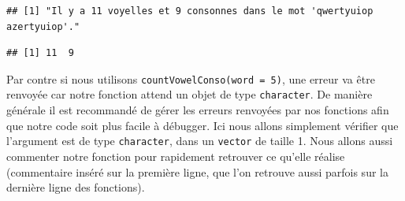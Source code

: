 \documentclass[
]{book}
\newenvironment{Shaded}{\begin{snugshade}}{\end{snugshade}}
\newcommand{\ControlFlowTok}[1]{\textcolor[rgb]{0.13,0.29,0.53}{\textbf{#1}}}
\newcommand{\DataTypeTok}[1]{\textcolor[rgb]{0.13,0.29,0.53}{#1}}
\newcommand{\DecValTok}[1]{\textcolor[rgb]{0.00,0.00,0.81}{#1}}
\newcommand{\KeywordTok}[1]{\textcolor[rgb]{0.13,0.29,0.53}{\textbf{#1}}}
\newcommand{\NormalTok}[1]{#1}
\newcommand{\OperatorTok}[1]{\textcolor[rgb]{0.81,0.36,0.00}{\textbf{#1}}}
\newcommand{\StringTok}[1]{\textcolor[rgb]{0.31,0.60,0.02}{#1}}
\begin{document}
\begin{Shaded}
\end{Shaded}

\begin{verbatim}
## [1] "Il y a 11 voyelles et 9 consonnes dans le mot 'qwertyuiop azertyuiop'."
\end{verbatim}

\begin{verbatim}
## [1] 11  9
\end{verbatim}

Par contre si nous utilisons \texttt{countVowelConso(word\ =\ 5)}, une erreur va être renvoyée car notre fonction attend un objet de type \texttt{character}. De manière générale il est recommandé de gérer les erreurs renvoyées par nos fonctions afin que notre code soit plus facile à débugger. Ici nous allons simplement vérifier que l'argument est de type \texttt{character}, dans un \texttt{vector} de taille 1. Nous allons aussi commenter notre fonction pour rapidement retrouver ce qu'elle réalise (commentaire inséré sur la première ligne, que l'on retrouve aussi parfois sur la dernière ligne des fonctions).
\end{document}
